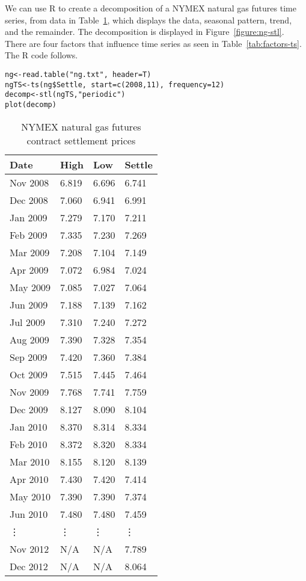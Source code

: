 We can use R to create a decomposition of a NYMEX natural gas futures time series, from data in Table~\ref{tab:ns-futures}, which displays the data, seasonal pattern, trend, and the remainder. The decomposition is displayed in Figure~\ref{figure:ng-stl}. There are four factors that influence time series as seen in Table~\ref{tab:factors-ts}. The R code follows.
\begin{verbatim}
ng<-read.table("ng.txt", header=T)
ngTS<-ts(ng$Settle, start=c(2008,11), frequency=12)
decomp<-stl(ngTS,"periodic")
plot(decomp)
\end{verbatim}

\begin{table}[tbp]
	\centering
	\begin{tabular}{llll}
	\toprule
	Date  &   High  &  Low  &  Settle \\
	\hline
	Nov 2008 & 6.819  &  6.696  &  6.741 \\
	Dec 2008 & 7.060  &  6.941  &  6.991 \\
	Jan 2009  & 7.279  &  7.170  &  7.211 \\
	Feb 2009  & 7.335  &  7.230  &  7.269 \\
	Mar 2009  & 7.208  &  7.104  &  7.149 \\
	Apr 2009  & 7.072  &  6.984  &  7.024 \\
	May 2009  & 7.085  &  7.027  &  7.064 \\
	Jun 2009  & 7.188  &  7.139  &  7.162 \\
	Jul 2009  & 7.310  &  7.240  &  7.272 \\
	Aug 2009  & 7.390  &  7.328  &  7.354 \\
	Sep 2009  & 7.420  &  7.360  &  7.384 \\
	Oct 2009 & 7.515  &  7.445  &  7.464 \\
	Nov 2009 & 7.768  &  7.741  &  7.759 \\
	Dec 2009 & 8.127  &  8.090  &  8.104 \\
	Jan 2010  & 8.370  &  8.314  &  8.334 \\
	Feb 2010  & 8.372  &  8.320  &  8.334 \\
	Mar 2010  & 8.155  &  8.120  &  8.139 \\
	Apr 2010  & 7.430  &  7.420  &  7.414 \\
	May 2010  & 7.390  &  7.390  &  7.374 \\
	Jun 2010  & 7.480  &  7.480  &  7.459 \\
	\vdots & \vdots & \vdots & \vdots \\
	Nov 2012 & N/A   &  N/A   &  7.789 \\
	Dec 2012 & N/A   &  N/A   &  8.064 \\
	\bottomrule
	\end{tabular}
	\caption{NYMEX natural gas futures contract settlement prices}
	\label{tab:ns-futures}
\end{table}

